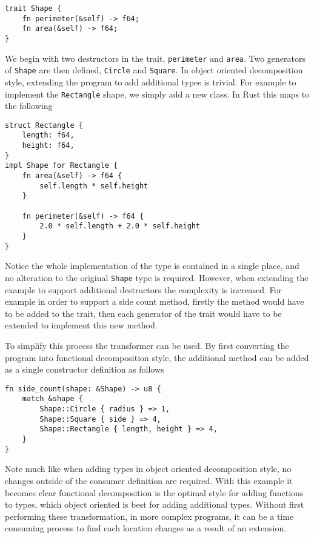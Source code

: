 \documentclass[ oneside,%
                    author={James Elgar},
                    degree={MEng},
                     title={Bidirectional transformer between functional and \\ object-oriented programming in Rust},
                  subtitle={}]{dissertation}
\newcommand{\rust}[1]{\texttt{#1}}
\begin{document}
\begin{verbatim}
trait Shape {
    fn perimeter(&self) -> f64;
    fn area(&self) -> f64;
}
\end{verbatim}

We begin with two destructors in the trait, \rust{perimeter} and \rust{area}. Two generators of \rust{Shape} are then defined, \rust{Circle} and \rust{Square}. In object oriented decomposition style, extending the program to add additional types is trivial. For example to implement the \rust{Rectangle} shape, we simply add a new class. In Rust this maps to the following 

\begin{verbatim}
struct Rectangle {
    length: f64,
    height: f64,
}
impl Shape for Rectangle {
    fn area(&self) -> f64 {
        self.length * self.height
    }

    fn perimeter(&self) -> f64 {
        2.0 * self.length + 2.0 * self.height
    }
}
\end{verbatim}

Notice the whole implementation of the type is contained in a single place, and no alteration to the original \rust{Shape} type is required. However, when extending the example to support additional destructors the complexity is increased. For example in order to support a side count method, firstly the method would have to be added to the trait, then each generator of the trait would have to be extended to implement this new method.

To simplify this process the transformer can be used. By first converting the program into functional decomposition style, the additional method can be added as a single constructor definition as follows

\begin{verbatim}
fn side_count(shape: &Shape) -> u8 {
    match &shape {
        Shape::Circle { radius } => 1,
        Shape::Square { side } => 4,
        Shape::Rectangle { length, height } => 4, 
    }
}
\end{verbatim}

Note much like when adding types in object oriented decomposition style, no changes outside of the consumer definition are required. With this example it becomes clear functional decomposition is the optimal style for adding functions to types, which object oriented is best for adding additional types. Without first performing these transformation, in more complex programs, it can be a time consuming process to find each location changes as a result of an extension.
\end{document}
